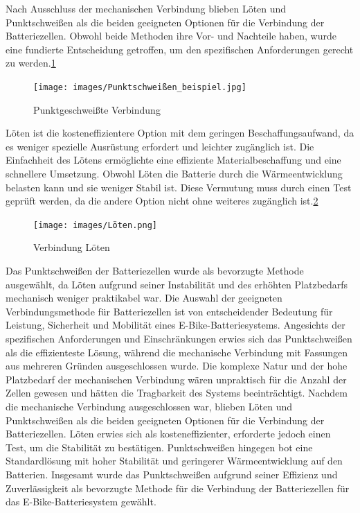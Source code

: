 Nach Ausschluss der mechanischen Verbindung blieben Löten und Punktschweißen als die beiden geeigneten Optionen für die Verbindung der Batteriezellen.
Obwohl beide Methoden ihre Vor- und Nachteile haben, wurde eine fundierte Entscheidung getroffen, um den spezifischen Anforderungen gerecht zu werden.\ref{fig:3}\\
\begin{figure}[ht]
    \centering
    \texttt{[image: images/Punktschweißen\_beispiel.jpg]}
    \caption{ Punktgeschweißte Verbindung\cite{lorenz_scherrer_selbst_2023}}%
    \label{fig:3}
\end{figure}

Löten ist die kosteneffizientere Option mit dem geringen Beschaffungsaufwand, da es weniger spezielle Ausrüstung erfordert und leichter zugänglich ist.
Die Einfachheit des Lötens ermöglichte eine effiziente Materialbeschaffung und eine schnellere Umsetzung.
Obwohl Löten die Batterie durch die Wärmeentwicklung belasten kann und sie weniger Stabil ist.
Diese Vermutung muss durch einen Test geprüft werden, da die andere Option nicht ohne weiteres zugänglich ist.\ref{fig:4}\\
\begin{figure}[ht]
    \centering
    \texttt{[image: images/Löten.png]}
    \caption{ Verbindung Löten\cite{lorenz_scherrer_selbst_2023}}
    \label{fig:4}
\end{figure}

Das Punktschweißen der Batteriezellen wurde als bevorzugte Methode ausgewählt, da Löten aufgrund seiner Instabilität und des erhöhten Platzbedarfs mechanisch weniger praktikabel war.
Die Auswahl der geeigneten Verbindungsmethode für Batteriezellen ist von entscheidender Bedeutung für Leistung, Sicherheit und Mobilität eines E-Bike-Batteriesystems.
Angesichts der spezifischen Anforderungen und Einschränkungen erwies sich das Punktschweißen als die effizienteste Lösung, während die mechanische Verbindung mit Fassungen aus mehreren Gründen ausgeschlossen wurde.
Die komplexe Natur und der hohe Platzbedarf der mechanischen Verbindung wären unpraktisch für die Anzahl der Zellen gewesen und hätten die Tragbarkeit des Systems beeinträchtigt.
Nachdem die mechanische Verbindung ausgeschlossen war, blieben Löten und Punktschweißen als die beiden geeigneten Optionen für die Verbindung der Batteriezellen.
Löten erwies sich als kosteneffizienter, erforderte jedoch einen Test, um die Stabilität zu bestätigen.
Punktschweißen hingegen bot eine Standardlösung mit hoher Stabilität und geringerer Wärmeentwicklung auf den Batterien.
Insgesamt wurde das Punktschweißen aufgrund seiner Effizienz und Zuverlässigkeit als bevorzugte Methode für die Verbindung der Batteriezellen für das E-Bike-Batteriesystem gewählt.\\




